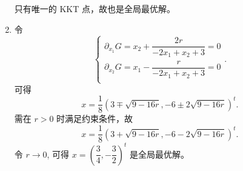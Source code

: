 \begin{Problem}
\begin{enumerate}[label=(\arabic*)]
        只有唯一的 KKT 点，故也是全局最优解。
        \item 令 
        \[
            \begin{cases}
                \partial_{x_1}G = x_2 + \dfrac{2r}{-2x_1 + x_2 + 3} = 0\\
                \partial_{x_2}G = x_1 - \dfrac{r}{-2x_1 + x_2 + 3} = 0\\
            \end{cases}.
        \]
        可得 
        \[
            x = \frac{1}{8}(3 \mp \sqrt{9 - 16r}, -6 \pm 2\sqrt{9 - 16r})^t.
        \] 
        需在 $r > 0$ 时满足约束条件，故 
        \[
            x = \frac{1}{8}(3 + \sqrt{9 - 16r}, -6 - 2\sqrt{9 - 16r})^t.
        \] 
        令 $r \to 0$, 可得 $x = \left(\dfrac{3}{4}, -\dfrac{3}{2}\right)^t$ 是全局最优解。
    \end{enumerate}
\end{Problem}

